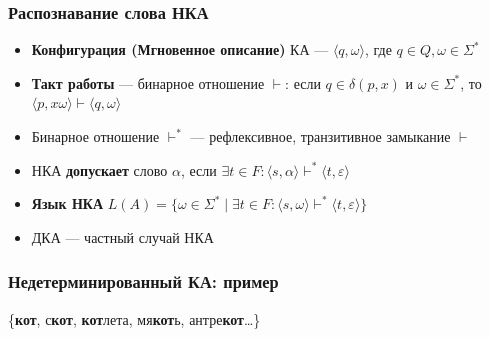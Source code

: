 \documentclass{beamer}
\begin{document}
\begin{frame}[fragile]
  \transwipe[direction=90]
  \frametitle{Распознавание слова НКА}
  \begin{itemize}
    \item \textbf{Конфигурация (Мгновенное описание)} КА --- $\langle q, \omega \rangle$, где $q \in Q, \omega \in \Sigma^*$
    \item \textbf{Такт работы} --- бинарное отношение $\vdash$: если $q \in \delta(p, x)$ и $\omega \in \Sigma ^*$, то $\langle p , x \omega \rangle \vdash \langle q , \omega \rangle$
    \item Бинарное отношение $\vdash^*$ --- рефлексивное, транзитивное замыкание $\vdash$
    \item НКА \textbf{допускает} слово $\alpha$, если $\exists t \in F : \langle s, \alpha \rangle \vdash^* \langle t, \varepsilon \rangle$
    \item \textbf{Язык НКА} $L(A) = \{ \omega \in \Sigma^* \mid \exists t \in F : \langle s, \omega \rangle \vdash^* \langle t, \varepsilon \rangle \}$
  \end{itemize}
  \begin{itemize}
    \item ДКА --- частный случай НКА
  \end{itemize}
\end{frame}

\begin{frame}[fragile]
  \transwipe[direction=90]
  \frametitle{Недетерминированный КА: пример}

      \begin{center}
      \end{center}

\vspace{20pt}

  \begin{center}
    \{\textbf{кот}, с\textbf{кот}, \textbf{кот}лета, мя\textbf{кот}ь, антре\textbf{кот}\dots \}
  \end{center}
\end{frame}
\end{document}
